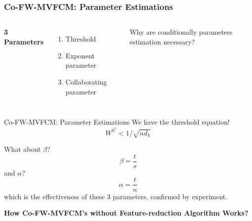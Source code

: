 \documentclass[compress,sky blue]{beamer}
\begin{document}
\begin{frame}
\frametitle{Co-FW-MVFCM: Parameter Estimations}
\begin{columns}[c] %

\textbf{3 Parameters}
\begin{enumerate}
\item Threshold 
\item Exponent parameter 
\item Collaborating parameter 
\end{enumerate}

Why are conditionally parameters estimation necessary?

\end{columns}
\end{frame}

\begin{frame}{Co-FW-MVFCM: Parameter Estimations}
We have the threshold equation!
\begin{equation}
W^{h^t} <1\Big/\sqrt{nd_h}
\label{PThres}
\end{equation}

What about $\beta$?
\begin{equation}
\beta=\frac{t}{s}
\label{PBeta}
\end{equation}
and $\alpha$?
\begin{equation}
\alpha=\frac{t}{n}
\label{PAlpha}
\end{equation}
which is the effectiveness of these 3 parameters, confirmed by experiment.
\end{frame}


\begin{frame}{}
    \centering
\Huge{\textbf{How Co-FW-MVFCM's without Feature-reduction Algorithm Works?}}
\end{frame}
\end{document}
